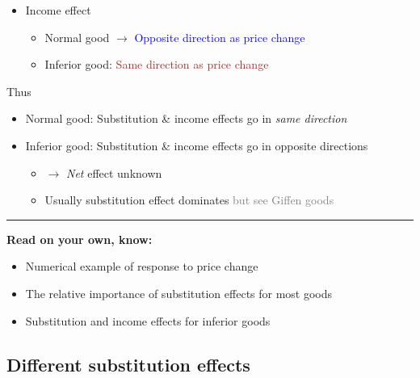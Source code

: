 \documentclass[]{article}
\providecommand{\tightlist}{%
  \setlength{\itemsep}{0pt}\setlength{\parskip}{0pt}}
\begin{document}
\begin{itemize}
\tightlist
\item
  Income effect

  \begin{itemize}
  \tightlist
  \item
    Normal good \(\rightarrow\)
    \textcolor{blue}{Opposite direction as price change}
  \item
    Inferior good: \textcolor{brown}{Same direction as price change}
    \pause
  \end{itemize}
\end{itemize}

\bigskip

Thus

\begin{itemize}
\tightlist
\item
  Normal good: Substitution \& income effects go in \emph{same
  direction}
\end{itemize}

\pause

\begin{itemize}
\tightlist
\item
  Inferior good: Substitution \& income effects go in opposite
  directions

  \begin{itemize}
  \tightlist
  \item
    \(\rightarrow\) \emph{Net} effect unknown
  \item
    Usually substitution effect dominates
    \textcolor{gray}{but see Giffen goods}
  \end{itemize}
\end{itemize}

\begin{center}\rule{0.5\linewidth}{\linethickness}\end{center}

\textbf{Read on your own, know:}

\begin{itemize}
\tightlist
\item
  Numerical example of response to price change
\item
  The relative importance of substitution effects for most goods
\item
  Substitution and income effects for inferior goods
\end{itemize}

\hypertarget{different-substitution-effects}{%
\subsection{Different substitution
effects}\label{different-substitution-effects}}
\end{document}
